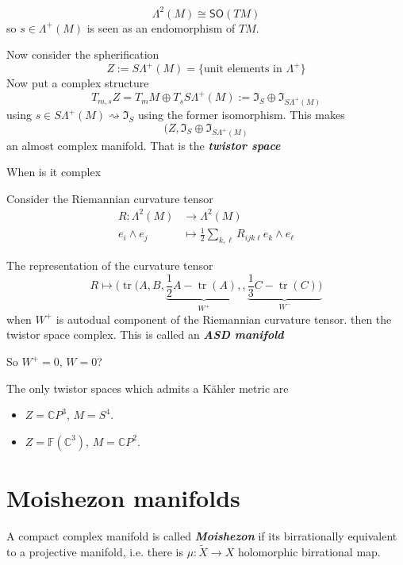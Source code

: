  \begin{remark}\leavevmode
 	\[\Lambda^{2}(M)\cong \mathsf{SO}(TM)\]
so $s\in\Lambda^{+}(M)$ is seen as an endomorphism of $TM$.
 \end{remark}

 Now consider the spherification
  \[Z:=S\Lambda^{+}(M)=\{\text{unit elements in }\Lambda^+ \}\]
Now put a complex structure 
\[T_{m,s}Z=T_mM\oplus T_sS\Lambda^{+}(M):=\mathfrak{I}_S\oplus \mathfrak{I}_{S\Lambda^{+}(M)}\]
using $s\in S\Lambda^{+}(M)\rightsquigarrow \mathfrak{I}_S$ using the former isomorphism. This makes
\[(Z,\mathfrak{I}_S\oplus \mathfrak{I}_{S\Lambda^{+}(M)}\]
an almost complex manifold. That is the \textit{\textbf{twistor space}}
\begin{question}\leavevmode
	When is it complex
\end{question}
Consider the Riemannian curvature tensor
\begin{align*}
	R: \Lambda^{2}(M) &\longrightarrow \Lambda^{2}(M) \\
	e_i\wedge e_j &\longmapsto \frac{1}{2} \sum_{k,\ell}R_{ijk\ell}e_k\wedge e_\ell
\end{align*}
\begin{thm}\leavevmode
	The representation of the curvature tensor
	\[R\longmapsto(\operatorname{tr}(A,B,\underbrace{\frac{1}{2}A-\operatorname{tr}(A),}_{W^+},\underbrace{\frac{1}{3}C-\operatorname{tr}(C))}_{W^-}\]
	when $W^+$ is autodual component of the Riemannian curvature tensor.
then the twistor space complex. This is called an \textit{\textbf{ASD manifold} }

So $W^+=0$, $W=0$?
\end{thm}

\begin{thm}[N. Hitchin]\leavevmode
	The only twistor spaces which admits a Kähler metric are
	\begin{itemize}
	\item $Z=\mathbb{C}P^{3}$, $M=S^4$.
	\item $Z=\mathbb{F}(\mathbb{C}^3)$, $M=\mathbb{C}P^{2}$.
	\end{itemize}
\end{thm}

\section{Moishezon manifolds}

\begin{defn}\leavevmode
	A compact complex manifold is called \textit{\textbf{Moishezon}} if its birrationally equivalent to a projective manifold, i.e. there is  $\mu:\tilde{X}\to  X$ holomorphic birrational map.
\end{defn}

